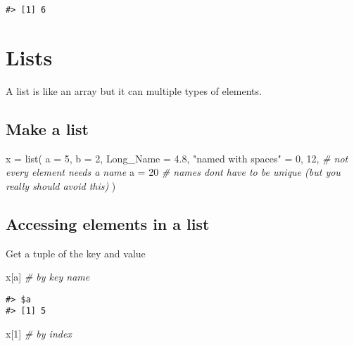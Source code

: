 \documentclass[
]{book}
\newenvironment{Shaded}{\begin{snugshade}}{\end{snugshade}}
\newcommand{\AttributeTok}[1]{\textcolor[rgb]{0.77,0.63,0.00}{#1}}
\newcommand{\CommentTok}[1]{\textcolor[rgb]{0.56,0.35,0.01}{\textit{#1}}}
\newcommand{\DecValTok}[1]{\textcolor[rgb]{0.00,0.00,0.81}{#1}}
\newcommand{\FloatTok}[1]{\textcolor[rgb]{0.00,0.00,0.81}{#1}}
\newcommand{\FunctionTok}[1]{\textcolor[rgb]{0.00,0.00,0.00}{#1}}
\newcommand{\NormalTok}[1]{#1}
\newcommand{\OtherTok}[1]{\textcolor[rgb]{0.56,0.35,0.01}{#1}}
\newcommand{\StringTok}[1]{\textcolor[rgb]{0.31,0.60,0.02}{#1}}
\begin{document}
\begin{verbatim}
#> [1] 6
\end{verbatim}

\hypertarget{lists}{%
\chapter{Lists}\label{lists}}

A list is like an array but it can multiple types of elements.

\hypertarget{make-a-list}{%
\section{Make a list}\label{make-a-list}}

\begin{Shaded}
\begin{Highlighting}[]
\NormalTok{x }\OtherTok{=} \FunctionTok{list}\NormalTok{(}
  \AttributeTok{a =} \DecValTok{5}\NormalTok{,}
  \AttributeTok{b =} \DecValTok{2}\NormalTok{,}
  \AttributeTok{Long\_Name =} \FloatTok{4.8}\NormalTok{,}
  \StringTok{"named with spaces"} \OtherTok{=} \DecValTok{0}\NormalTok{,}
  \DecValTok{12}\NormalTok{, }\CommentTok{\# not every element needs a name}
  \AttributeTok{a =} \DecValTok{20} \CommentTok{\# names don\textquotesingle{}t have to be unique (but you really should avoid this)}
\NormalTok{)}
\end{Highlighting}
\end{Shaded}

\hypertarget{accessing-elements-in-a-list}{%
\section{Accessing elements in a list}\label{accessing-elements-in-a-list}}

Get a tuple of the key and value

\begin{Shaded}
\begin{Highlighting}[]
\NormalTok{x[}\StringTok{\textquotesingle{}a\textquotesingle{}}\NormalTok{] }\CommentTok{\# by key name}
\end{Highlighting}
\end{Shaded}

\begin{verbatim}
#> $a
#> [1] 5
\end{verbatim}

\begin{Shaded}
\begin{Highlighting}[]
\NormalTok{x[}\DecValTok{1}\NormalTok{]   }\CommentTok{\# by index}
\end{Highlighting}
\end{Shaded}
\end{document}
